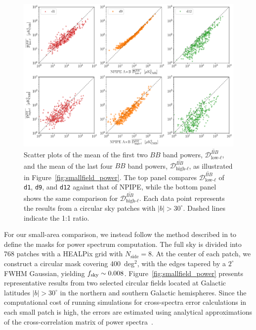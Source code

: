 \documentclass[twocolumn]{aastex631}
\begin{document}
\begin{figure}
    \centering
    \includegraphics[width=2.1\columnwidth]{figures/llmean_hlmean_comparison.pdf}
    \caption{Scatter plots of the mean of the first two $BB$ band powers, $\overline{\mathcal{D}_{\text{low-}\ell}^{BB}}$, and the mean of the last four $BB$ band powers, $\overline{\mathcal{D}_{\text{high-}\ell}^{BB}}$, as illustrated in Figure~\ref{fig:smallfield_power}. The top panel compares $\overline{\mathcal{D}_{\text{low-}\ell}^{BB}}$ of \texttt{d1}, \texttt{d9}, and \texttt{d12} against that of NPIPE, while the bottom panel shows the same comparison for $\overline{\mathcal{D}_{\text{high-}\ell}^{BB}}$. Each data point represents the results from a circular sky patches with $|b| > 30^\circ$. Dashed lines indicate the 1:1 ratio.}
    \label{fig:smallfield_power_all}
\end{figure}

For our small-area comparison, we instead follow the method described in \cite{planck2014-XXX} to define the masks for power spectrum computation. The full sky is divided into 768 patches with a HEALPix grid with $N_\text{side} = 8$. At the center of each patch, we construct a circular mask covering 400~deg$^2$, with the edges tapered by a $2^\circ$ FWHM Gaussian, yielding $f_{\rm sky} \sim 0.008$. Figure~\ref{fig:smallfield_power} presents representative results from two selected circular fields located at Galactic latitudes $|b| > 30^\circ$ in the northern and southern Galactic hemispheres. Since the computational cost of running simulations for cross-spectra error calculations in each small patch is high, the errors are estimated using analytical approximations of the cross-correlation matrix of power spectra~\citep{Tristram:2005}.
\end{document}
